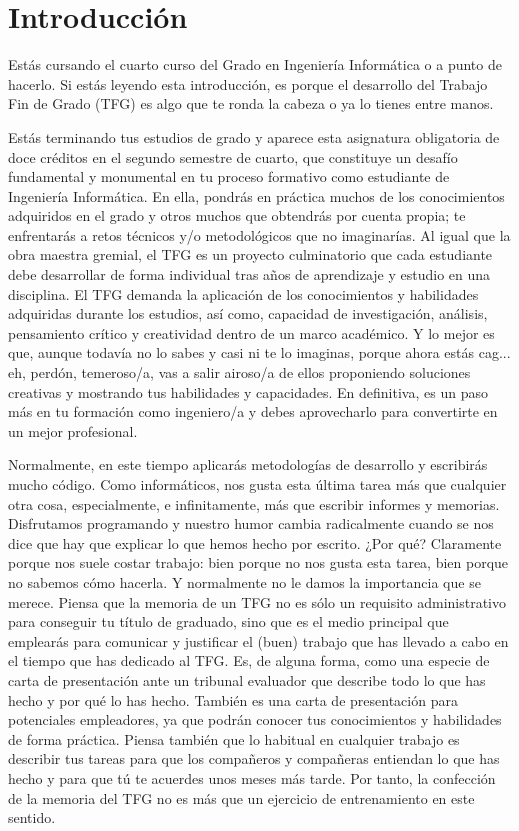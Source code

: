 \chapter{Introducción}
\label{cap:Introducción}

Estás cursando el cuarto curso del Grado en Ingeniería Informática o a punto de hacerlo. Si estás leyendo esta introducción, es porque el desarrollo del Trabajo Fin de Grado (TFG) es algo que te ronda la cabeza o ya lo tienes entre manos. 

Estás terminando tus estudios de grado y aparece esta asignatura obligatoria de doce créditos en el segundo semestre de cuarto, que constituye un desafío fundamental y monumental en tu proceso formativo como estudiante de Ingeniería Informática. En ella, pondrás en práctica muchos de los conocimientos adquiridos en el grado y otros muchos que obtendrás por cuenta propia; te enfrentarás a retos técnicos y/o metodológicos que no imaginarías. Al igual que la obra maestra gremial, el TFG es un proyecto culminatorio que cada estudiante debe desarrollar de forma individual tras años de aprendizaje y estudio en una disciplina. El TFG demanda la aplicación de los conocimientos y habilidades adquiridas durante los estudios, así como, capacidad de investigación, análisis, pensamiento crítico y creatividad dentro de un marco académico. Y lo mejor es que, aunque todavía no lo sabes y casi ni te lo imaginas, porque ahora estás cag... eh, perdón, temeroso/a, vas a salir airoso/a de ellos proponiendo soluciones creativas y mostrando tus habilidades y capacidades. En definitiva, es un paso más en tu formación como ingeniero/a y debes aprovecharlo para convertirte en un mejor profesional.

Normalmente, en este tiempo aplicarás metodologías de desarrollo y escribirás mucho código. Como informáticos, nos gusta esta última tarea más que cualquier otra cosa, especialmente, e infinitamente, más que escribir informes y memorias. Disfrutamos programando y nuestro humor cambia radicalmente cuando se nos dice que hay que explicar lo que hemos hecho por escrito. ¿Por qué? Claramente porque nos suele costar trabajo: bien porque no nos gusta esta tarea, bien porque no sabemos cómo hacerla. Y normalmente no le damos la importancia que se merece. Piensa que la memoria de un TFG no es sólo un requisito administrativo para conseguir tu título de graduado, sino que es el medio principal que emplearás para comunicar y justificar el (buen) trabajo que has llevado a cabo en el tiempo que has dedicado al TFG. Es, de alguna forma, como una especie de carta de presentación ante un tribunal evaluador que describe todo lo que has hecho y por qué lo has hecho. También es una carta de presentación para potenciales empleadores, ya que podrán conocer tus conocimientos y habilidades de forma práctica. Piensa también que lo habitual en cualquier trabajo es describir tus tareas para que los compañeros y compañeras entiendan lo que has hecho y para que tú te acuerdes unos meses más tarde. Por tanto, la confección de la memoria del TFG no es más que un ejercicio de entrenamiento en este sentido.

